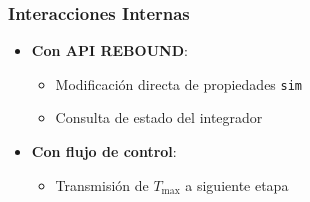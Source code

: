\subsubsection{Interacciones Internas}
\begin{itemize}
    \item \textbf{Con API REBOUND}:
    \begin{itemize}
        \item Modificación directa de propiedades \texttt{sim}
        \item Consulta de estado del integrador
    \end{itemize}
    \item \textbf{Con flujo de control}:
    \begin{itemize}
        \item Transmisión de $T_{\text{max}}$ a siguiente etapa
    \end{itemize}
\end{itemize}
\newpage
